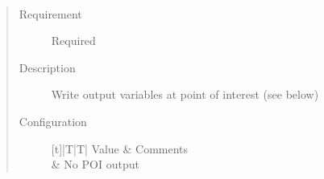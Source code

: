 \documentclass[letterpaper,10pt,english]{sphinxmanual}
\begin{document}
\begin{fulllineitems}
\label{\detokenize{input_files/SOLWEIG_input/SOLWEIGinput:cmdoption-arg-solweigpoi-out}}~\begin{quote}\begin{description}
\item[{Requirement}] \leavevmode
Required

\item[{Description}] \leavevmode
Write output variables at point of interest (see below)

\item[{Configuration}] \leavevmode

\begin{savenotes}\sphinxattablestart
\centering
\begin{tabulary}{\linewidth}[t]{|T|T|}
\hline
\sphinxstyletheadfamily 
Value
&\sphinxstyletheadfamily 
Comments
\\
&
No POI output
\\
\hline
\end{tabulary}
\par
\sphinxattableend\end{savenotes}

\end{description}\end{quote}

\end{fulllineitems}

\end{document}
